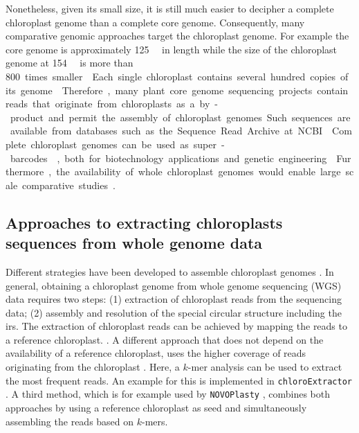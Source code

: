 \documentclass{bmcart}
\newcommand{\formatprogramnames}[1]{\texttt{#1}}
\newcommand{\ce}{\formatprogramnames{chloroExtractor}}
\newcommand{\np}{\formatprogramnames{NOVOPlasty}}
\begin{document}
Nonetheless, given its small size, it is still much easier to decipher a complete chloroplast genome than a complete core genome. Consequently, many comparative genomic approaches target the chloroplast genome.
For example the  core genome is approximately \SI{125}{\mega\basepair} in length \cite{schmuths2004,cao2011} while the size of the  chloroplast genome at \SI{154}{\kilo\basepair} is more than \SI{800} times smaller \cite{sato1999}.

Each single chloroplast contains several hundred copies of its genome \cite{kumar_2014,bendich_1987}.
Therefore, many plant core genome sequencing projects contain reads that originate from chloroplasts as a by-product and permit the assembly of chloroplast genomes.
Such sequences are available from databases such as the Sequence Read Archive at NCBI \cite{sra2010}.

Complete chloroplast genomes can be used as super-barcodes \cite{coissac_barcodes_2016}, both for biotechnology applications and genetic engineering \cite{daniell_chloroplast_2016}.
Furthermore, the availability of whole chloroplast genomes would enable large scale comparative studies \cite{tonti-filippini_what_2017}.


\subsection*{Approaches to extracting chloroplasts sequences from whole genome data}

Different strategies have been developed to assemble chloroplast genomes \cite{twyford_strategies_2017}.
In general, obtaining a chloroplast genome from whole genome sequencing (WGS) data requires two steps: (1) extraction of chloroplast reads from the sequencing data;  
(2) assembly and resolution of the special circular structure including the \glspl{ir}.
The extraction of chloroplast reads can be achieved by mapping the reads to a reference chloroplast. \cite{Vinga2012}.
A different approach that does not depend on the availability of a reference chloroplast, uses the higher coverage of reads originating from the chloroplast \cite{Chan2013}.
Here, a $k$-mer analysis can be used to extract the most frequent reads.
An example for this is implemented in \ce{} \cite{j_ankenbrand_chloroextractor:_2018}. 
A third method, which is for example used by \np{} \cite{dierckxsens_novoplasty:_2017}, combines both approaches by using a reference chloroplast as seed and simultaneously assembling the reads based on $k$-mers. 
\end{document}
